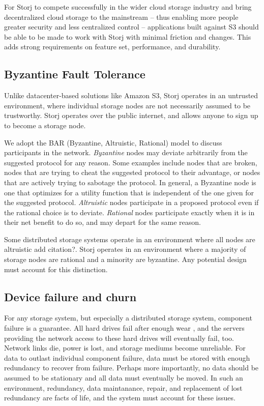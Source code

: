 \documentclass[a4paper,10pt]{article} \usepackage[utf8]{inputenc}
\begin{document}
For Storj to compete successfully in the wider cloud storage industry and bring
decentralized cloud storage to the mainstream -- thus enabling more people
greater security and less centralized control -- applications built against S3
should be able to be made to work with Storj with minimal friction and changes.
This adds strong requirements on feature set, performance, and durability.

\subsection{Byzantine Fault Tolerance}

Unlike datacenter-based solutions like Amazon S3, Storj operates in an untrusted
environment, where individual storage nodes are not necessarily assumed to be
trustworthy. Storj operates over the public internet, and allows anyone to sign
up to become a storage node.

We adopt the BAR (Byzantine, Altruistic, Rational) model \cite{bar} to discuss
participants in the network.
{\em Byzantine} nodes may deviate arbitrarily from the suggested protocol for
any reason. Some examples include nodes that are broken, nodes that are
trying to cheat the suggested protocol to their advantage, or nodes that
are actively trying to sabotage the protocol. In general, a Byzantine node is
one that optimizes for a utility function that is independent of the one
given for the suggested protocol.
{\em Altruistic} nodes
participate in a proposed protocol even if the rational choice is to deviate.
{\em Rational} nodes participate exactly when it is in their net benefit to do
so, and may depart for the same reason.

Some distributed storage systems operate in an environment where all nodes are
altruistic {\color{red}add citation?}. Storj operates in an environment where a
majority of storage nodes are rational and a minority are byzantine. Any
potential design must account for this distinction.

\subsection{Device failure and churn}

For any storage system, but especially a distributed storage system, component
failure is a guarantee. All hard drives fail after enough wear
\cite{backblaze-hd-2018-q1}, and the servers providing the network access to
these hard drives will eventually fail, too. Network links die, power is lost,
and storage mediums become unreliable. For data to outlast individual component
failure, data must be stored with enough redundancy to recover from failure.
Perhaps more importantly, no data should be assumed to be stationary and all
data must eventually be moved. In such an environment, redundancy, data
maintanance, repair, and replacement of lost redundancy are facts of life, and
the system must account for these issues.
\end{document}
